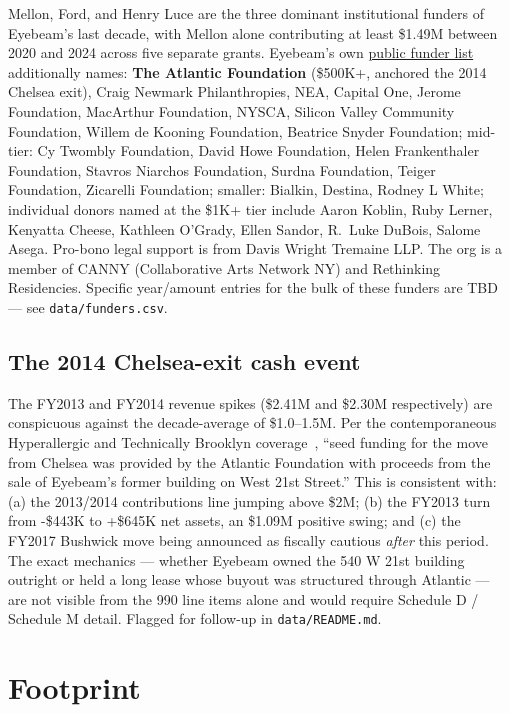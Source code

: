 \documentclass[10pt,letterpaper,twocolumn]{article}
\begin{document}
Mellon, Ford, and Henry Luce are the three dominant institutional funders of Eyebeam's last decade, with Mellon alone contributing at least \$1.49M between 2020 and 2024 across five separate grants. Eyebeam's own \href{https://eyebeam.org/support/}{public funder list} additionally names: \textbf{The Atlantic Foundation} (\$500K+, anchored the 2014 Chelsea exit), Craig Newmark Philanthropies, NEA, Capital One, Jerome Foundation, MacArthur Foundation, NYSCA, Silicon Valley Community Foundation, Willem de Kooning Foundation, Beatrice Snyder Foundation; mid-tier: Cy Twombly Foundation, David Howe Foundation, Helen Frankenthaler Foundation, Stavros Niarchos Foundation, Surdna Foundation, Teiger Foundation, Zicarelli Foundation; smaller: Bialkin, Destina, Rodney L White; individual donors named at the \$1K+ tier include Aaron Koblin, Ruby Lerner, Kenyatta Cheese, Kathleen O'Grady, Ellen Sandor, R.~Luke DuBois, Salome Asega. Pro-bono legal support is from Davis Wright Tremaine LLP. The org is a member of CANNY (Collaborative Arts Network NY) and Rethinking Residencies. Specific year/amount entries for the bulk of these funders are TBD --- see \texttt{data/funders.csv}.

\subsection{The 2014 Chelsea-exit cash event}

The FY2013 and FY2014 revenue spikes (\$2.41M and \$2.30M respectively) are conspicuous against the decade-average of \$1.0--1.5M. Per the contemporaneous Hyperallergic and Technically Brooklyn coverage~\citep{hyperallergic2014bushwick,technically2014sunsetpark}, ``seed funding for the move from Chelsea was provided by the Atlantic Foundation with proceeds from the sale of Eyebeam's former building on West 21st Street.'' This is consistent with: (a) the 2013/2014 contributions line jumping above \$2M; (b) the FY2013 turn from -\$443K to +\$645K net assets, an \$1.09M positive swing; and (c) the FY2017 Bushwick move being announced as fiscally cautious \emph{after} this period. The exact mechanics --- whether Eyebeam owned the 540 W 21st building outright or held a long lease whose buyout was structured through Atlantic --- are not visible from the 990 line items alone and would require Schedule D / Schedule M detail. Flagged for follow-up in \texttt{data/README.md}.

\section{Footprint}
\end{document}
